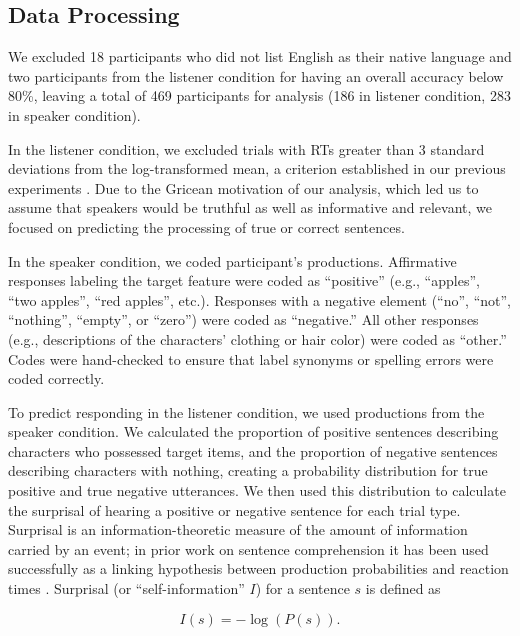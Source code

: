 \documentclass[man, noapacite]{apa2}
\begin{document}
\subsection{Data Processing} 
  
We excluded 18 participants who did not list English as their native language and two participants from the listener condition for having an overall accuracy below 80\%, leaving a total of 469 participants for analysis (186 in listener condition, 283 in speaker condition). 

In the listener condition, we excluded trials with RTs greater than 3 standard deviations from the log-transformed mean, a criterion established in our previous experiments \cite{nordmeyer2014}.  Due to the Gricean motivation of our analysis, which led us to assume that speakers would be truthful as well as informative and relevant, we focused on predicting the processing of true or correct sentences.   

In the speaker condition, we coded participant's productions. Affirmative responses labeling the target feature were coded as ``positive'' (e.g., ``apples'', ``two apples'', ``red apples'', etc.).  Responses with a negative element (``no'', ``not'', ``nothing'', ``empty'', or ``zero'') were coded as ``negative.''  All other responses (e.g., descriptions of the characters' clothing or hair color) were coded as ``other.''  Codes were hand-checked to ensure that label synonyms or spelling errors were coded correctly.  

To predict responding in the listener condition, we used productions from the speaker condition. We calculated the proportion of positive sentences describing characters who possessed target items, and the proportion of negative sentences describing characters with nothing, creating a probability distribution for true positive and true negative utterances.  We then used this distribution to calculate the surprisal of hearing a positive or negative sentence for each trial type. Surprisal is an information-theoretic measure of the amount of information carried by an event; in prior work on sentence comprehension it has been used successfully as a linking hypothesis between production probabilities and reaction times \cite{levy2008}. Surprisal (or ``self-information'' $I$) for a sentence $s$ is defined as

\begin{equation}
\label{eq:surprise}
I(s) = -\log(P(s)).
\end{equation}
\end{document}
